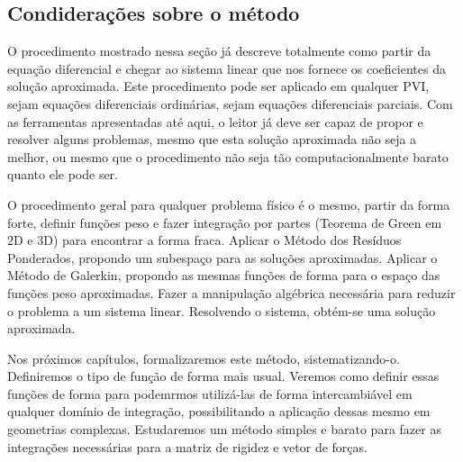     \subsection{Condiderações sobre o método}

        O procedimento mostrado nessa seção já descreve totalmente como partir da equação diferencial e chegar ao sistema linear que nos fornece os coeficientes da solução aproximada. Este procedimento pode ser aplicado em qualquer PVI, sejam equações diferenciais ordinárias, sejam equações diferenciais parciais. Com as ferramentas apresentadas até aqui, o leitor já deve ser capaz de propor e resolver alguns problemas, mesmo que esta solução aproximada não seja a melhor, ou mesmo que o procedimento não seja tão computacionalmente barato quanto ele pode ser.

        O procedimento geral para qualquer problema físico é o mesmo, partir da forma forte, definir funções peso e fazer integração por partes (Teorema de Green em 2D e 3D) para encontrar a forma fraca. Aplicar o Método dos Resíduos Ponderados, propondo um subespaço para as soluções aproximadas. Aplicar o Método de Galerkin, propondo as mesmas funções de forma para o espaço das funções peso aproximadas. Fazer a manipulação algébrica necessária para reduzir o problema a um sistema linear. Resolvendo o sistema, obtém-se uma solução aproximada.

        Nos próximos capítulos, formalizaremos este método, sistematizando-o. Definiremos o tipo de função de forma mais usual. Veremos como definir essas funções de forma para podemrmos utilizá-las de forma intercambiável em qualquer domínio de integração, possibilitando a aplicação dessas mesmo em geometrias complexas. Estudaremos um método simples e barato para fazer as integrações necessárias para a matriz de rigidez e vetor de forças.